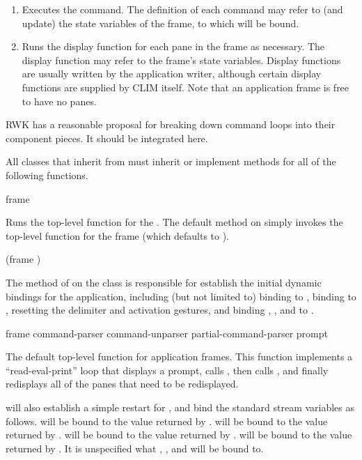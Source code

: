 {\begin{enumerate}
\item Executes the command.  The definition of each command may refer to (and
update) the state variables of the frame, to which  will
be bound.

\item Runs the display function for each pane in the frame as necessary.  The
display function may refer to the frame's state variables.  Display functions
are usually written by the application writer, although certain display
functions are supplied by CLIM itself.  Note that an application frame is free
to have no panes.
\end{enumerate}


 {RWK has a reasonable proposal for breaking down command loops into
their component pieces.  It should be integrated here.}

All classes that inherit from  must inherit or implement
methods for all of the following functions.


 {frame \key \allow}

Runs the top-level function for the  .  The default
method on  simply invokes the top-level function for the
frame (which defaults to ).

 {(frame ) \key}

The  method of  on the
 class is responsible for establish the initial dynamic
bindings for the application, including (but not limited to) binding
 to , binding  to
, resetting the delimiter and activation gestures, and binding
, , and
 to .


 {frame \key command-parser command-unparser 
                                                  partial-command-parser
                                                  prompt}

The default top-level function for application frames.  This function implements
a ``read-eval-print'' loop that displays a prompt, calls
, then calls , and finally
redisplays all of the panes that need to be redisplayed.

 will also establish a simple restart for
, and bind the standard stream variables as follows.
 will be bound to the value returned by
.   will be bound to the value
returned by .   will be bound to the
value returned by .   will be bound to the
value returned by .  It is unspecified what
, , and  will be bound to.

}
